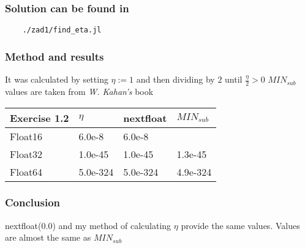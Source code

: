 \documentclass[12pt]{article}
\begin{document}
\subsubsection*{Solution can be found in}
\begin{verbatim}
    ./zad1/find_eta.jl
\end{verbatim}
\subsubsection*{Method and results}
It was calculated by setting $\eta:= 1$ and then dividing by $2$ until $\frac{\eta}{2} > 0$
$MIN_{sub}$ values are taken from \emph{W. Kahan's} book
\begin{table}[!ht]
    \centering
    \begin{tabular}{|l|l|l|l|}
    \hline
        Exercise 1.2 & $\eta$ & nextfloat & $MIN_{sub}$ \\ \hline
        Float16 & 6.0e-8 & 6.0e-8 & ~ \\ \hline
        Float32 & 1.0e-45 & 1.0e-45 & 1.3e-45 \\ \hline
        Float64 & 5.0e-324 & 5.0e-324 & 4.9e-324 \\ \hline
    \end{tabular}
\end{table}
\subsubsection*{Conclusion}
nextfloat(0.0) and my method of calculating $\eta$ provide the same values. \newline
Values are almost the same as $MIN_{sub}$
\end{document}
